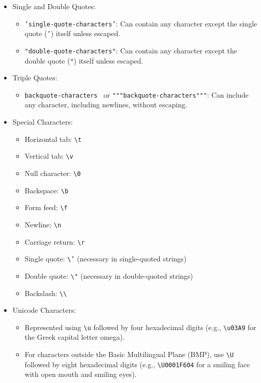 \begin{itemize}
    \item Single and Double Quotes:
    \begin{itemize}
        \item \texttt{'single-quote-characters'}: Can contain any character except the single quote (\texttt{'}) itself unless escaped.
        \item \texttt{"double-quote-characters"}: Can contain any character except the double quote (\texttt{"}) itself unless escaped.
    \end{itemize}
    \item Triple Quotes:
    \begin{itemize}
        \item \texttt{\texttt{\textquotesingle{}\textquotesingle{}\textquotesingle{}backquote-characters\textquotesingle{}\textquotesingle{}\textquotesingle{}}
} or \texttt{"""backquote-characters"""}: Can include any character, including newlines, without escaping.
    \end{itemize}
    \item Special Characters:
    \begin{itemize}
        \item Horizontal tab: \texttt{\textbackslash t}
        \item Vertical tab: \texttt{\textbackslash v}
        \item Null character: \texttt{\textbackslash 0}
        \item Backspace: \texttt{\textbackslash b}
        \item Form feed: \texttt{\textbackslash f}
        \item Newline: \texttt{\textbackslash n}
        \item Carriage return: \texttt{\textbackslash r}
        \item Single quote: \texttt{\textbackslash '} (necessary in single-quoted strings)
        \item Double quote: \texttt{\textbackslash "} (necessary in double-quoted strings)
        \item Backslash: \texttt{\textbackslash\textbackslash}
    \end{itemize}
    \item Unicode Characters:
    \begin{itemize}
        \item Represented using \texttt{\textbackslash u} followed by four hexadecimal digits (e.g., \texttt{\textbackslash u03A9} for the Greek capital letter omega).
        \item For characters outside the Basic Multilingual Plane (BMP), use \texttt{\textbackslash U} followed by eight hexadecimal digits (e.g., \texttt{\textbackslash U0001F604} for a smiling face with open mouth and smiling eyes).
    \end{itemize}
\end{itemize}
